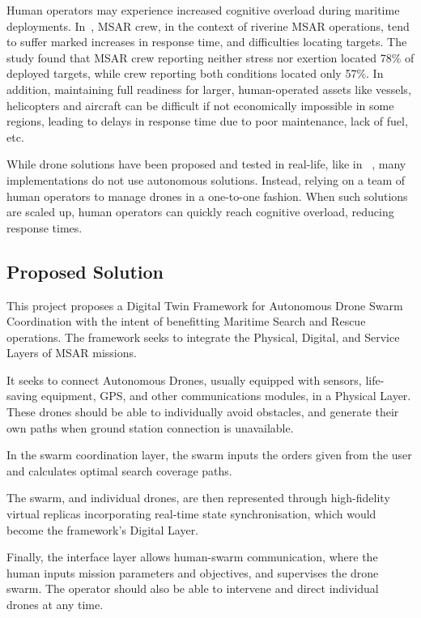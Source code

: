 Human operators may experience increased cognitive overload during maritime deployments.
In~\cite{riverine_MSAR_stress}, MSAR crew, in the context of riverine MSAR operations, tend to suffer marked increases in response time, and difficulties locating targets.
The study found that MSAR crew reporting neither stress nor exertion located 78\% of deployed targets, while crew reporting both conditions located only 57\%.
In addition, maintaining full readiness for larger, human-operated assets like vessels, helicopters and aircraft can be difficult if not economically impossible in some regions, leading to delays in response time due to poor maintenance, lack of fuel, etc.

While drone solutions have been proposed and tested in real-life, like in ~\cite{7761074}, many implementations do not use autonomous solutions.
Instead, relying on a team of human operators to manage drones in a one-to-one fashion.
When such solutions are scaled up, human operators can quickly reach cognitive overload, reducing response times.

\subsection{Proposed Solution}\label{subsec:proposed-solution}
This project proposes a Digital Twin Framework for Autonomous Drone Swarm Coordination with the intent of benefitting Maritime Search and Rescue operations.
The framework seeks to integrate the Physical, Digital, and Service Layers of MSAR missions.

It seeks to connect Autonomous Drones, usually equipped with sensors, life-saving equipment, GPS, and other communications modules, in a Physical Layer.
These drones should be able to individually avoid obstacles, and generate their own paths when ground station connection is unavailable.

In the swarm coordination layer, the swarm inputs the orders given from the user and calculates optimal search coverage paths.

The swarm, and individual drones, are then represented through high-fidelity virtual replicas incorporating real-time state synchronisation, which would become the framework's Digital Layer.

Finally, the interface layer allows human-swarm communication, where the human inputs mission parameters and objectives, and supervises the drone swarm.
The operator should also be able to intervene and direct individual drones at any time.

